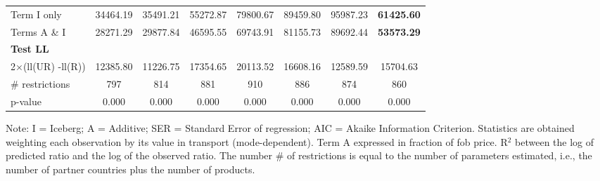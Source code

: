 \documentclass[a4paper,11pt]{article}
\begin{document}
\begin{table}[H]
\begin{center}
{\begin{tabular}{lccccccc}
Term I only & 34464.19 & 35491.21 & \multicolumn{1}{c}{55272.87} & \multicolumn{1}{c}{79800.67} & \multicolumn{1}{c}{89459.80} & \multicolumn{1}{c}{95987.23} & \multicolumn{1}{c}{\textbf{61425.60}} \\
Terms A \& I & 28271.29 & 29877.84 & \multicolumn{1}{c}{46595.55} & \multicolumn{1}{c}{69743.91} & \multicolumn{1}{c}{81155.73} & \multicolumn{1}{c}{89692.44} & \multicolumn{1}{c}{\textbf{53573.29}} \\
\textbf{Test LL} &       &       & \multicolumn{1}{c}{} & \multicolumn{1}{c}{} & \multicolumn{1}{c}{} & \multicolumn{1}{c}{} & \multicolumn{1}{c}{} \\
2$\times$(ll(UR) -ll(R)) & 12385.80 & 11226.75 & \multicolumn{1}{c}{17354.65} & \multicolumn{1}{c}{20113.52} & \multicolumn{1}{c}{16608.16} & \multicolumn{1}{c}{12589.59} & \multicolumn{1}{c}{15704.63} \\
\# restrictions  & 797   & 814   & \multicolumn{1}{c}{881} & \multicolumn{1}{c}{910} & \multicolumn{1}{c}{886} & \multicolumn{1}{c}{874} & \multicolumn{1}{c}{860} \\
p-value & 0.000 & 0.000 & \multicolumn{1}{c}{0.000} & \multicolumn{1}{c}{0.000} & \multicolumn{1}{c}{0.000} & \multicolumn{1}{c}{0.000} & \multicolumn{1}{c}{0.000} \\

\hline\hline
\end{tabular}}
\end{center}
  \vspace{-10pt}\tiny{Note: I = Iceberg; A = Additive; SER = Standard Error of regression; AIC = Akaike Information Criterion. Statistics are obtained weighting each observation by its value in transport (mode-dependent). Term A expressed in fraction of fob price. R$^{2}$ between the log of predicted ratio and the log of the observed ratio. The number \# of restrictions is equal to the number of parameters estimated, i.e., the number of partner countries plus the number of products.}
\end{table}%
\end{document}
